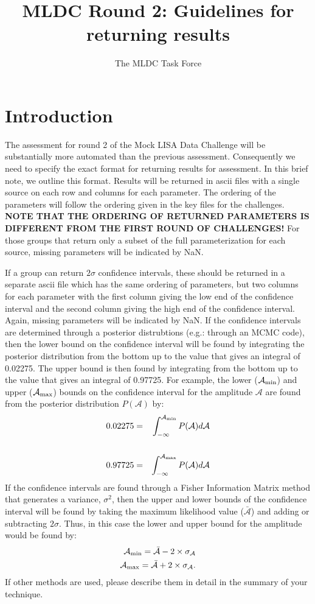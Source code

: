 \documentclass[11pt]{article}
\title{MLDC Round 2: Guidelines for returning results}
\author{The MLDC Task Force}
\begin{document}
\maketitle
\section{Introduction}
The assessment for round 2 of the Mock LISA Data Challenge will be substantially more automated than the previous assessment. Consequently we need to specify the exact format for returning results for assessment. In this brief note, we outline this format. Results will be returned in ascii files with a single source on each row and columns for each parameter. The ordering of the parameters will follow the ordering given in the key files for the challenges. {\bf NOTE THAT THE ORDERING OF RETURNED PARAMETERS IS DIFFERENT FROM THE FIRST ROUND OF CHALLENGES!} For those groups that return only a subset of the full parameterization for each source, missing parameters will be indicated by NaN. 

If a group can return $2\sigma$ confidence intervals, these should be returned in a separate ascii file which has the same ordering of parameters, but two columns for each parameter with the first column giving the low end of the confidence interval and the second column giving the high end of the confidence interval. Again, missing parameters will be indicated by NaN. If the confidence intervals are determined through a posterior distrubtions (e.g.: through an MCMC code), then the lower bound on the confidence interval will be found by integrating the posterior distribution from the bottom up to the value that gives an integral of 0.02275. The upper bound is then found by integrating from the bottom up to the value that gives an integral of 0.97725. For example, the lower ($\mathcal{A}_{\rm min}$) and upper ($\mathcal{A}_{\rm max}$) bounds on the confidence interval for the amplitude $\mathcal{A}$ are found from the posterior distribution $P(\mathcal{A})$ by:
\begin{eqnarray}
0.02275 & = & \int_{-\infty}^{\mathcal{A}_{\rm min}}{P(\mathcal{A})d\mathcal{A}} \\
\nonumber \\
0.97725 & = & \int_{-\infty}^{\mathcal{A}_{\rm max}}{P(\mathcal{A})d\mathcal{A}} \\
\end{eqnarray}
If the confidence intervals are found through a Fisher Information Matrix method that generates a variance, $\sigma^2$, then the upper and lower bounds of the confidence interval will be found by taking the maximum likelihood value ($\bar{\mathcal{A}}$) and adding or subtracting $2\sigma$. Thus, in this case the lower and upper bound for the amplitude would be found by:
\begin{eqnarray}
\mathcal{A}_{\rm min} = \bar{\mathcal{A}} - 2 \times \sigma_{\mathcal{A}} \\
\mathcal{A}_{\rm max} = \bar{\mathcal{A}} + 2 \times \sigma_{\mathcal{A}}.
\end{eqnarray}
If other methods are used, please describe them in detail in the summary of your technique.
\end{document}
